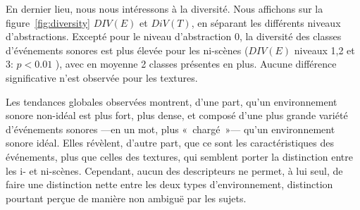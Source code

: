 En dernier lieu, nous nous intéressons à la diversité. Nous affichons sur la figure~\ref{fig:diversity} $DIV(E)$ et $DiV(T)$, en séparant les différents niveaux d'abstractions. Excepté pour le niveau d'abstraction 0, la diversité des classes d'événements sonores est plus élevée pour les ni-scènes ($DIV(E)$ niveaux 1,2 et 3: $p<0.01$ ), avec en moyenne 2 classes présentes en plus. Aucune différence significative n'est observée pour les textures.

Les tendances globales observées montrent, d'une part, qu'un environnement sonore non-idéal est plus fort, plus dense, et composé d'une plus grande variété d'événements sonores ---en un mot, plus «~chargé~»--- qu'un environnement sonore idéal. Elles révèlent, d'autre part, que ce sont les caractéristiques des événements, plus que celles des textures, qui semblent porter la distinction entre les i- et ni-scènes. Cependant, aucun des descripteurs ne permet, à lui seul, de faire une distinction nette entre les deux types d'environnement, distinction pourtant perçue de manière non ambiguë par les sujets.

